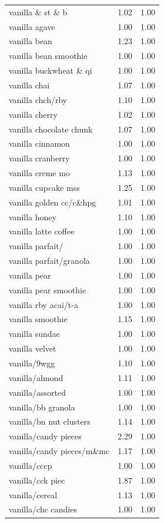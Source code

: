 \begin{table}
\begin{tabular}{lrr}
vanilla \& st \& b & 1.02 & 1.00 \\
vanilla agave & 1.00 & 1.00 \\
vanilla bean & 1.23 & 1.00 \\
vanilla bean smoothie & 1.00 & 1.00 \\
vanilla buckwheat \& qi & 1.00 & 1.00 \\
vanilla chai & 1.07 & 1.00 \\
vanilla chch/rby & 1.10 & 1.00 \\
vanilla cherry & 1.02 & 1.00 \\
vanilla chocolate chunk & 1.07 & 1.00 \\
vanilla cinnamon & 1.00 & 1.00 \\
vanilla cranberry & 1.00 & 1.00 \\
vanilla creme mo & 1.13 & 1.00 \\
vanilla cupcake mss & 1.25 & 1.00 \\
vanilla golden cc/c\&hpg & 1.01 & 1.00 \\
vanilla honey & 1.10 & 1.00 \\
vanilla latte coffee & 1.00 & 1.00 \\
vanilla parfait/ & 1.00 & 1.00 \\
vanilla parfait/granola & 1.00 & 1.00 \\
vanilla pear & 1.00 & 1.00 \\
vanilla pear smoothie & 1.00 & 1.00 \\
vanilla rby acai/t-a & 1.00 & 1.00 \\
vanilla smoothie & 1.15 & 1.00 \\
vanilla sundae & 1.00 & 1.00 \\
vanilla velvet & 1.00 & 1.00 \\
vanilla/9wgg & 1.10 & 1.00 \\
vanilla/almond & 1.11 & 1.00 \\
vanilla/assorted & 1.00 & 1.00 \\
vanilla/bb granola & 1.00 & 1.00 \\
vanilla/bn nut clusters & 1.14 & 1.00 \\
vanilla/candy pieces & 2.29 & 1.00 \\
vanilla/candy pieces/m\&mc & 1.17 & 1.00 \\
vanilla/cccp & 1.00 & 1.00 \\
vanilla/cck piec & 1.87 & 1.00 \\
vanilla/cereal & 1.13 & 1.00 \\
vanilla/chc candies & 1.00 & 1.00 \\

\end{tabular}
\end{table}
